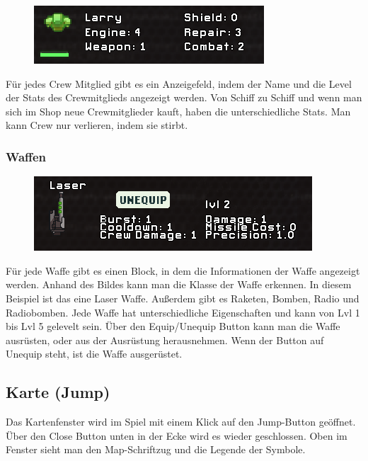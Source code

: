 \documentclass[fontsize=12pt,paper=a4,twoside]{scrartcl}
\begin{document}
\begin{figure}[H]
\centering
\includegraphics[width=0.8\linewidth]{DasSpiel/Inventar/crew.png}
\end{figure} 

Für jedes Crew Mitglied gibt es ein Anzeigefeld, indem der Name und die Level der Stats des Crewmitglieds angezeigt werden. Von Schiff zu Schiff und wenn man sich im Shop neue Crewmitglieder kauft, haben die unterschiedliche Stats. Man kann Crew nur verlieren, indem sie stirbt. 


\subsubsection{Waffen} \label{sec:WaffenInventory}

\begin{figure}[H]
\centering
\includegraphics[width=0.8\linewidth]{DasSpiel/Inventar/waffe.png}
\end{figure} 

Für jede Waffe gibt es einen Block, in dem die Informationen der Waffe angezeigt werden. Anhand des Bildes kann man die Klasse der Waffe erkennen. In diesem Beispiel ist das eine Laser Waffe. Außerdem gibt es Raketen, Bomben, Radio und Radiobomben. Jede Waffe hat unterschiedliche Eigenschaften und kann von Lvl 1 bis Lvl 5 gelevelt sein. Über den Equip/Unequip Button kann man die Waffe ausrüsten, oder aus der Ausrüstung herausnehmen. Wenn der Button auf Unequip steht, ist die Waffe ausgerüstet. 




\subsection{Karte (Jump)}

Das Kartenfenster wird im Spiel mit einem Klick auf den Jump-Button geöffnet. Über den Close Button unten in der Ecke wird es wieder geschlossen. Oben im Fenster sieht man den Map-Schriftzug und die Legende der Symbole.
\end{document}
